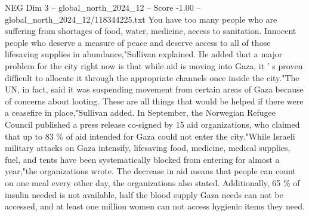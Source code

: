 \begin{textsample}{NEG Dim 3 – global\_north\_2024\_12 – Score -1.00 – global\_north\_2024\_12/118344225.txt}
You have too many people who are suffering from shortages of food, water, medicine, access to sanitation.
Innocent people who deserve a measure of peace and deserve access to all of those lifesaving supplies in abundance,"Sullivan explained.
He added that a major problem for the city right now is that while aid is moving into Gaza, it ' s proven difficult to allocate it through the appropriate channels once inside the city."The UN, in fact, said it was suspending movement from certain areas of Gaza because of concerns about looting.
These are all things that would be helped if there were a ceasefire in place,"Sullivan added.
In September, the Norwegian Refugee Council published a press release co-signed by 15 aid organizations, who claimed that up to 83 \% of aid intended for Gaza could not enter the city."While Israeli military attacks on Gaza intensify, lifesaving food, medicine, medical supplies, fuel, and tents have been systematically blocked from entering for almost a year,"the organizations wrote.
The decrease in aid means that people can count on one meal every other day, the organizations also stated.
Additionally, 65 \% of insulin needed is not available, half the blood supply Gaza needs can not be accessed, and at least one million women can not access hygienic items they need.

\end{textsample}

